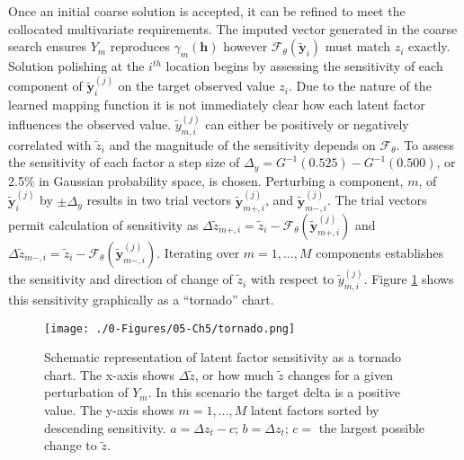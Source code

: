 Once an initial coarse solution is accepted, it can be refined to meet the collocated multivariate requirements. The imputed vector generated in the coarse search ensures $Y_{m}$ reproduces $\gamma_{m}(\mathbf{h})$ however $\mathcal{F}_{\theta}(\tilde{\mathbf{y}}_{i})$ must match $z_{i}$ exactly. Solution polishing at the $i^{th}$ location begins by assessing the sensitivity of each component of  $\tilde{\mathbf{y}}_{i}^{(j)}$ on the target observed value $z_{i}$. Due to the nature of the learned mapping function it is not immediately clear how each latent factor influences the observed value. $\tilde{y}_{m, i}^{(j)}$ can either be positively or negatively correlated with $\tilde{z}_{i}$ and the magnitude of the sensitivity depends on $\mathcal{F}_{\theta}$. To assess the sensitivity of each factor a step size of $\Delta_{y} = G^{-1}(0.525)-G^{-1}(0.500)$, or 2.5\% in Gaussian probability space, is chosen. Perturbing a component, $m$, of $\tilde{\mathbf{y}}^{(j)}_{i}$ by $\pm \Delta_{y}$ results in two trial vectors $\tilde{\mathbf{y}}_{m+, i}^{(j)}$, and $\tilde{\mathbf{y}}_{m-,i}^{(j)}$. The trial vectors permit calculation of sensitivity as  $\Delta\tilde{z}_{m+,i} = \tilde{z}_{i} - \mathcal{F}_{\theta}(\tilde{\mathbf{y}}_{m+, i}^{(j)})$ and $\Delta\tilde{z}_{m-,i} = \tilde{z}_{i} - \mathcal{F}_{\theta}(\tilde{\mathbf{y}}_{m-,i}^{(j)})$. Iterating over $m=1,\dots,M$ components establishes the sensitivity and direction of change of $\tilde{z}_{i}$ with respect to $\tilde{y}_{m, i}^{(j)}$. Figure \ref{fig:tornado} shows this sensitivity graphically as a ``tornado'' chart.

\begin{figure}[htb!]
    \centering
    \texttt{[image: ./0-Figures/05-Ch5/tornado.png]}
    \caption{Schematic representation of latent factor sensitivity as a tornado chart. The x-axis shows $\Delta \tilde{z}$, or how much $\tilde{z}$ changes for a given perturbation of $Y_{m}$. In this scenario the target delta is a positive value. The y-axis shows $m=1,\dots,M$ latent factors sorted by descending sensitivity. $a = \Delta z_{t} - c$; $b=\Delta z_{t}$; $c=$ the largest possible change to $\tilde{z}$.}
    \label{fig:tornado}
\end{figure}

